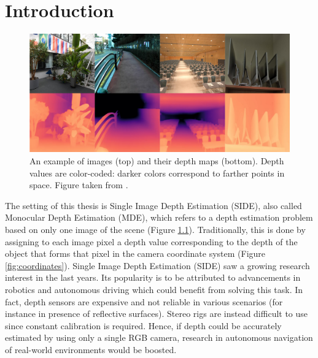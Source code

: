 \chapter{Introduction}
\label{ch:intro}
%
\begin{figure}
    \centering
    \includegraphics[scale=0.3]{figs/depth_maps_example2}
    \caption[Example of depth maps.]{
        An example of images (top) and their depth maps (bottom).
        Depth values are color-coded: darker colors correspond to farther points in space.
        Figure taken from \cite{ZoeDepth}.
        \label{fig:depth_maps_example}
    }
\end{figure}
The setting of this thesis is Single Image Depth Estimation (SIDE), also called Monocular Depth Estimation (MDE), which refers to a depth estimation problem based on only one image of the scene (Figure \ref{fig:depth_maps_example}).
Traditionally, this is done by assigning to each image pixel a depth value corresponding to the depth of the object that forms that pixel in the camera coordinate system (Figure \ref{fig:coordinates}).
Single Image Depth Estimation (SIDE) saw a growing research interest in the last years.
Its popularity is to be attributed to advancements in robotics and autonomous driving which could benefit from solving this task.
In fact, depth sensors are expensive and not reliable in various scenarios (for instance in presence of reflective surfaces).
Stereo rigs are instead difficult to use since constant calibration is required.
Hence, if depth could be accurately estimated by using only a single RGB camera, research in autonomous navigation of real-world environments would be boosted.

